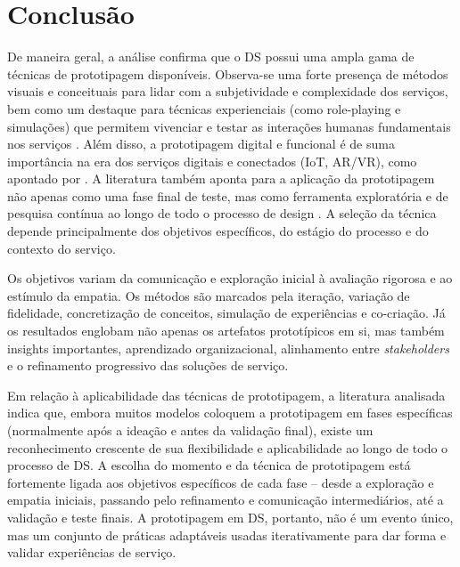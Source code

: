 \chapter[Conclusão]{Conclusão}

De maneira geral, a análise confirma que o DS possui uma ampla gama de técnicas de prototipagem disponíveis. Observa-se uma forte presença de métodos visuais e conceituais para lidar com a subjetividade e complexidade dos serviços, bem como um destaque para técnicas experienciais (como role-playing e simulações) que permitem vivenciar e testar as interações humanas fundamentais nos serviços \cite{soto2023prototyping, seko2024transitions}. Além disso, a prototipagem digital e funcional é de suma importância na era dos serviços digitais e conectados (IoT, AR/VR), como apontado por . A literatura também aponta para a aplicação da prototipagem não apenas como uma fase final de teste, mas como ferramenta exploratória e de pesquisa contínua ao longo de todo o processo de design \cite{soto2023prototyping, paust2025integrative}. A seleção da técnica depende principalmente dos objetivos específicos, do estágio do processo e do contexto do serviço.

Os objetivos variam da comunicação e exploração inicial à avaliação rigorosa e ao estímulo da empatia. Os métodos são marcados pela iteração, variação de fidelidade, concretização de conceitos, simulação de experiências e co-criação. Já os resultados englobam não apenas os artefatos prototípicos em si, mas também insights importantes, aprendizado organizacional, alinhamento entre \textit{stakeholders} e o refinamento progressivo das soluções de serviço.

Em relação à aplicabilidade das técnicas de prototipagem, a literatura analisada indica que, embora muitos modelos coloquem a prototipagem em fases específicas (normalmente após a ideação e antes da validação final), existe um reconhecimento crescente de sua flexibilidade e aplicabilidade ao longo de todo o processo de DS. A escolha do momento e da técnica de prototipagem está fortemente ligada aos objetivos específicos de cada fase – desde a exploração e empatia iniciais, passando pelo refinamento e comunicação intermediários, até a validação e teste finais. A prototipagem em DS, portanto, não é um evento único, mas um conjunto de práticas adaptáveis usadas iterativamente para dar forma e validar experiências de serviço.



